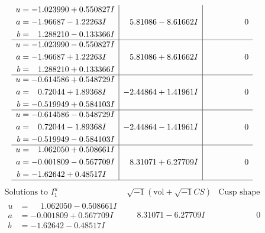 \documentclass[1p]{elsarticle_modified}
\theoremstyle{definition}
\newcommand{\I}{\sqrt{-1}}
\begin{document}
$$\begin{array}{c|c|c}
\begin{aligned}
u &= -1.023990 + 0.550827 I \\
a &= -1.96687 - 1.22263 I \\
b &= \phantom{-}1.288210 - 0.133366 I\end{aligned}
 & \phantom{-}5.81086 - 8.61662 I & \phantom{-0.000000 } 0 \\ \hline\begin{aligned}
u &= -1.023990 - 0.550827 I \\
a &= -1.96687 + 1.22263 I \\
b &= \phantom{-}1.288210 + 0.133366 I\end{aligned}
 & \phantom{-}5.81086 + 8.61662 I & \phantom{-0.000000 } 0 \\ \hline\begin{aligned}
u &= -0.614586 + 0.548729 I \\
a &= \phantom{-}0.72044 + 1.89368 I \\
b &= -0.519949 + 0.584103 I\end{aligned}
 & -2.44864 + 1.41961 I & \phantom{-0.000000 } 0 \\ \hline\begin{aligned}
u &= -0.614586 - 0.548729 I \\
a &= \phantom{-}0.72044 - 1.89368 I \\
b &= -0.519949 - 0.584103 I\end{aligned}
 & -2.44864 - 1.41961 I & \phantom{-0.000000 } 0 \\ \hline\begin{aligned}
u &= \phantom{-}1.062050 + 0.508661 I \\
a &= -0.001809 - 0.567709 I \\
b &= -1.62642 + 0.48517 I\end{aligned}
 & \phantom{-}8.31071 + 6.27709 I & \phantom{-0.000000 } 0\\
 \hline 
 \end{array}$$\newpage$$\begin{array}{c|c|c}  
\text{Solutions to }I^u_{1}& \I (\text{vol} + \sqrt{-1}CS) & \text{Cusp shape}\\
 \hline 
\begin{aligned}
u &= \phantom{-}1.062050 - 0.508661 I \\
a &= -0.001809 + 0.567709 I \\
b &= -1.62642 - 0.48517 I\end{aligned}
 & \phantom{-}8.31071 - 6.27709 I & \phantom{-0.000000 } 0 \\ \hline\begin{aligned}

\end{aligned}
\end{array}$$
\end{document}
